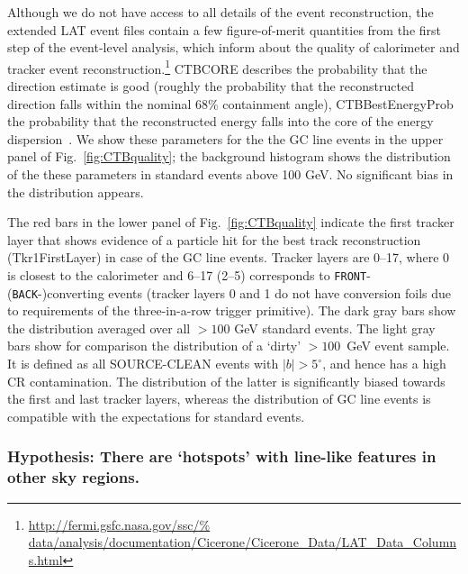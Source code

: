 \documentclass[aps,twocolumn,prd,superscriptaddress,showpacs,nofootinbib,fixfloat]{revtex4}
\begin{document}
Although we do not have access to all details of the event reconstruction, the
extended LAT event files contain a few figure-of-merit quantities from the first step of the
event-level analysis, which inform about the quality of
calorimeter and tracker event reconstruction.\footnote{\url{http://fermi.gsfc.nasa.gov/ssc/%
data/analysis/documentation/Cicerone/Cicerone\_Data/LAT\_Data\_Columns.html}}
CTBCORE describes the probability that the direction estimate
is good (roughly the probability that the reconstructed
direction falls within the nominal 68\% containment angle),
CTBBestEnergyProb the probability that the reconstructed
energy falls into the core of the energy
dispersion~\cite{collaboration:2012kca}. We show
these parameters for the the GC line events in the upper
panel of Fig.~\ref{fig:CTBquality}; the background histogram
shows the distribution of the these parameters in standard
events above 100 GeV. No significant bias in the distribution
appears.

The red bars in the lower panel of
Fig.~\ref{fig:CTBquality} indicate the first tracker layer that
shows evidence of a particle hit for the best track
reconstruction (Tkr1FirstLayer) in case of the GC line
events.  Tracker layers are 0--17, where 0 is closest to the
calorimeter and 6--17 (2--5) corresponds to \texttt{FRONT}-
(\texttt{BACK}-)converting events (tracker layers 0 and 1 do not have
conversion foils due to requirements of the three-in-a-row trigger
primitive). The dark gray bars show the
distribution averaged over all $>100$ GeV standard events.
The light gray bars
show for comparison the distribution of a `dirty' $>100$~GeV event sample.
It is defined as all SOURCE-CLEAN events with $|b|>5^\circ$,
and hence has a high
CR contamination. The distribution of the latter is significantly biased
towards the first and last tracker layers, whereas
the distribution of GC line events is compatible with the
expectations for standard events.

\subsubsection{Hypothesis: There are `hotspots' with
line-like features in other sky regions.}
\end{document}
